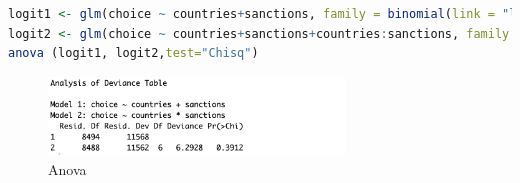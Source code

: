 \documentclass[12pt,letterpaper]{article}
\begin{document}
\begin{enumerate}
\begin{enumerate}
\begin{lstlisting}[language=R]
logit1 <- glm(choice ~ countries+sanctions, family = binomial(link = "logit"), data = DF)
logit2 <- glm(choice ~ countries+sanctions+countries:sanctions, family = binomial(link = "logit"), data = DF)
anova (logit1, logit2,test="Chisq")\end{lstlisting}
\begin{figure}[H] 
	\includegraphics[width=0.7\textwidth]{Anova.png} 
	\caption{Anova} 
\end{figure}
	
	\end{enumerate}
	\end{enumerate}
\end{document}
